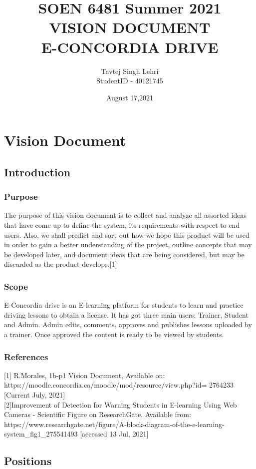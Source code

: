 \documentclass{report}
\title{\normalsize {SOEN 6481 Summer 2021}\\[1.0cm]
\huge \textbf{\uppercase{Vision Document}} \\
\huge \textbf{\uppercase{e-concordia drive}}\\
\normalsize \vspace*{2\baselineskip}
}
\author{{Tavtej Singh Lehri\\
StudentID - 40121745}}
\date{August 17,2021}
\begin{document}
\maketitle

\tableofcontents
\clearpage

\chapter{Vision Document}
\section{Introduction}
\subsection{Purpose}
The purpose of this vision document is to collect and analyze all assorted ideas that have come up to define the system, its requirements with respect to end users. Also, we shall predict and sort out how we hope this product will be used in order to gain a better understanding of the project, outline concepts that may be developed later, and document ideas that are being considered, but may be discarded as the product develops.[1]

\subsection{Scope}
E-Concordia drive is an E-learning platform for students to learn and practice driving lessons to obtain a license. It has got three main users: Trainer, Student and Admin.
Admin edits, comments, approves and publishes  lessons uploaded by a trainer.
Once approved the content is ready to be viewed by students.

\subsection{References}
{\footnotesize[1] R.Morales, 1b-p1 Vision Document, Available on:
https://moodle.concordia.ca/moodle/mod/resource/view.php?id= 2764233 [Current July, 2021]}\\

{\footnotesize[2]Improvement of Detection for Warning Students in E-learning Using Web Cameras - Scientific Figure on ResearchGate. Available from: https://www.researchgate.net/figure/A-block-diagram-of-the-e-learning-system\_fig1\_275541493 [accessed 13 Jul, 2021]}


\section{Positions}
\end{document}
